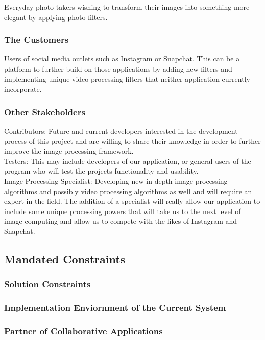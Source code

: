 \documentclass[12pt, titlepage]{article}
\begin{document}
Everyday photo takers wishing to transform their images into something more elegant by applying photo filters. 

\subsubsection{The Customers}

Users of social media outlets such as Instagram or Snapchat. This can be a platform to further build on those applications by adding new filters and implementing unique video processing filters that neither application currently incorporate. 

\subsubsection{Other Stakeholders}

Contributors: Future and current developers interested in the development process of this project and are willing to share their knowledge in order to further improve the image processing framework.\\


Testers: This may include developers of our application, or general users of the program who will test the projects functionality and usability.\\


Image Processing Specialist: Developing new in-depth image processing algorithms and possibly video processing algorithms as well and will require an expert in the field. The addition of a specialist will really allow our application to include some unique processing powers that will take us to the next level of image computing and allow us to compete with the likes of Instagram and Snapchat.


\subsection{Mandated Constraints}

\subsubsection{Solution Constraints}
\subsubsection{Implementation Enviornment of the Current System}
\subsubsection{Partner of Collaborative Applications}
\end{document}
